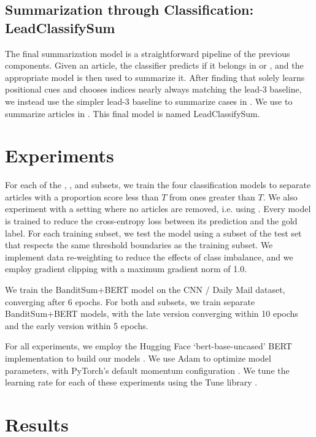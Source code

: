 \subsection{Summarization through Classification: LeadClassifySum}
The final summarization model is a straightforward pipeline of the previous components. Given an article, the classifier predicts if it belongs in \Dearly{} or \Dlate{}, and the appropriate model is then used to summarize it. After finding that \BanSumEarly{} solely learns positional cues and chooses indices nearly always matching the lead-3 baseline, we instead use the simpler lead-3 baseline to summarize cases in \Dearly{}. We use \BanSumLate{} to summarize articles in \Dlate{}. This final model is named LeadClassifySum.

\section{Experiments}
For each of the \Dtwenty{}, \Dthirty{}, \Dfifty{} and \Dsixty{} subsets, we train the four classification models to separate articles with a proportion score less than $T$ from ones greater than $T$. We also experiment with a setting where no articles are removed, i.e. using \Dall{}. Every model is trained to reduce the cross-entropy loss between its prediction and the gold label. For each training subset, we test the model using a subset of the test set that respects the same threshold boundaries as the training subset. We implement data re-weighting to reduce the effects of class imbalance, and we employ gradient clipping with a maximum gradient norm of 1.0.

We train the BanditSum+BERT model on the CNN / Daily Mail dataset, converging after 6 epochs. For both \Dearly{} and \Dlate{} subsets, we train separate BanditSum+BERT models, with the late version converging within 10 epochs and the early version within 5 epochs.

For all experiments, we employ the Hugging Face `bert-base-uncased' BERT implementation to build our models \parencite{Wolf2019HuggingFacesTS}. We use Adam to optimize model parameters, with PyTorch's default momentum configuration \parencite{adam_kingma2014adam, pytorch}. We tune the learning rate for each of these experiments using the Tune library \parencite{tune}.

\section{Results}
